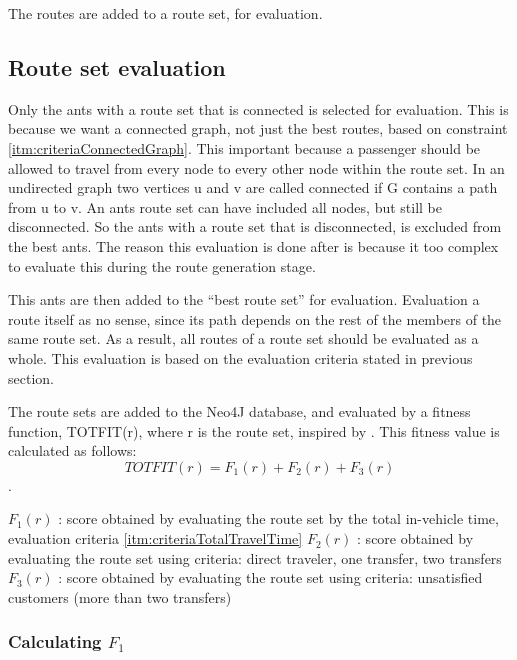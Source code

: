 The routes are added to a route set, for evaluation.

\subsection{Route set evaluation}
Only the ants with a route set that is connected is selected for evaluation. This is because we want a connected graph, not just the best routes, based on constraint \ref{itm:criteriaConnectedGraph}. This important because a passenger should be allowed to travel from every node to every other node within the route set. In an undirected graph two vertices u and v are called connected if G contains a path from u to v. An ants route set can have included all nodes, but still be disconnected. So the ants with a route set that is disconnected, is excluded from the best ants. The reason this evaluation is done after is because it too complex to evaluate this during the route generation stage. 

This ants are then added to the ``best route set'' for evaluation. Evaluation a route itself as no sense, since its path depends on the rest of the members of the same route set. As a result, all routes of a route set should be evaluated as a whole. This evaluation is based on the evaluation criteria stated in previous section.

The route sets are added to the Neo4J database, and evaluated by a fitness function, TOTFIT(r), where r is the route set, inspired by \citep{kechagiopoulos14}.
This fitness value is calculated as follows:
$$ TOTFIT(r) = F_{1}(r) + F_{2}(r) + F_{3}(r)$$. 

$ F_{1}(r)$ : score obtained by evaluating the route set by the total in-vehicle time, evaluation criteria \ref{itm:criteriaTotalTravelTime}
\newline
$ F_{2}(r)$ : score obtained by evaluating the route set using criteria: direct traveler, one transfer, two transfers
\newline
$ F_{3}(r)$ : score obtained by evaluating the route set using criteria: unsatisfied customers (more than two transfers)
\newline

\subsubsection{Calculating $F_{1}$}

